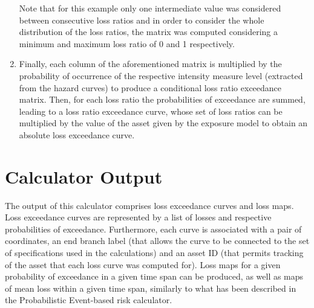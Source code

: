\begin{enumerate}
Note that for this example only one intermediate value was considered between consecutive loss ratios and in order to consider the whole distribution of the loss ratios, the matrix was computed considering a minimum and maximum loss ratio of 0 and 1 respectively.

\item Finally, each column of the aforementioned matrix is multiplied by the probability of occurrence of the respective intensity measure level (extracted from the hazard curves) to produce a conditional loss ratio exceedance matrix.  Then, for each loss ratio the probabilities of exceedance are summed, leading to a loss ratio exceedance curve, whose set of loss ratios can be multiplied by the value of the \gls{asset} given by the \gls{exposure model} to obtain an absolute loss exceedance curve.

\end{enumerate}

\section{Calculator Output}
The output of this calculator comprises loss exceedance curves and loss maps. Loss exceedance curves are represented by a list of losses and respective probabilities of exceedance. Furthermore, each curve is associated with a pair of coordinates, an end branch label (that allows the curve to be connected to the set of specifications used in the calculations) and an asset ID (that permits tracking of the asset that each loss curve was computed for). Loss maps for a given probability of exceedance in a given time span can be produced, as well as maps of mean loss within a given time span, similarly to what has been described in the Probabilistic Event-based risk calculator.
